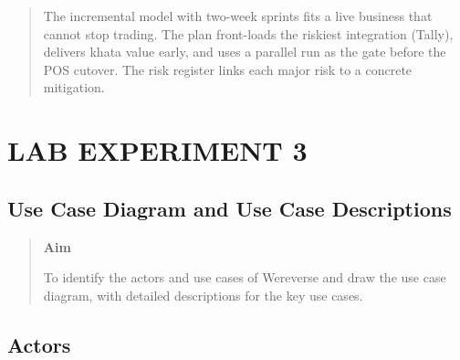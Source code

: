 \documentclass[12pt,a4paper]{article}
\begin{document}
\begin{quote}
The incremental model with two-week sprints fits a live business that
cannot stop trading. The plan front-loads the riskiest integration
(Tally), delivers khata value early, and uses a parallel run as the gate
before the POS cutover. The risk register links each major risk to a
concrete mitigation.
\end{quote}

\clearpage
\section{LAB EXPERIMENT 3}\label{lab-experiment-3}

\subsection{Use Case Diagram and Use Case
Descriptions}\label{use-case-diagram-and-use-case-descriptions}

\begin{quote}
\textbf{Aim}

To identify the actors and use cases of Wereverse and draw the use case
diagram, with detailed descriptions for the key use cases.
\end{quote}

\subsection{Actors}\label{actors}
\end{document}
